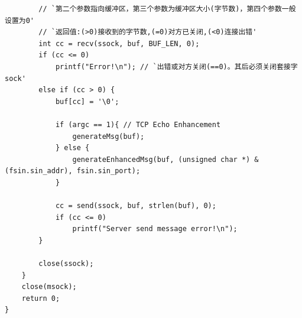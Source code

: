 \documentclass[logo,reportComp]{thesis}
\begin{document}
\begin{lstlisting}
        // `第二个参数指向缓冲区，第三个参数为缓冲区大小(字节数)，第四个参数一般设置为0'
        // `返回值:(>0)接收到的字节数,(=0)对方已关闭,(<0)连接出错'
        int cc = recv(ssock, buf, BUF_LEN, 0);
        if (cc <= 0)
            printf("Error!\n"); // `出错或对方关闭(==0)。其后必须关闭套接字sock'
        else if (cc > 0) {
            buf[cc] = '\0';

            if (argc == 1){ // TCP Echo Enhancement
                generateMsg(buf);
            } else {
                generateEnhancedMsg(buf, (unsigned char *) &(fsin.sin_addr), fsin.sin_port);
            }

            cc = send(ssock, buf, strlen(buf), 0);
            if (cc <= 0)
                printf("Server send message error!\n");
        }

        close(ssock);
    }
    close(msock);
    return 0;
}
\end{lstlisting}
\end{document}
